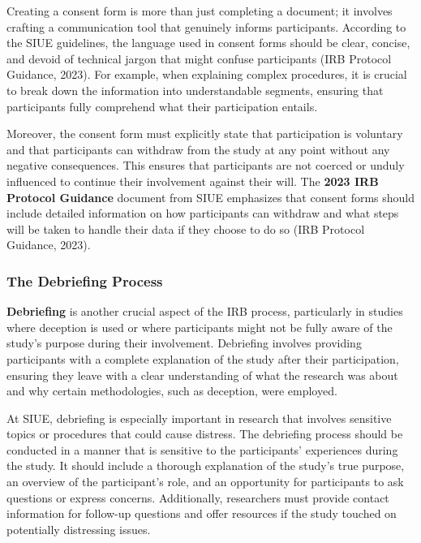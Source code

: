 \documentclass[
]{book}
\begin{document}
Creating a consent form is more than just completing a document; it involves crafting a communication tool that genuinely informs participants. According to the SIUE guidelines, the language used in consent forms should be clear, concise, and devoid of technical jargon that might confuse participants (IRB Protocol Guidance, 2023). For example, when explaining complex procedures, it is crucial to break down the information into understandable segments, ensuring that participants fully comprehend what their participation entails.

Moreover, the consent form must explicitly state that participation is voluntary and that participants can withdraw from the study at any point without any negative consequences. This ensures that participants are not coerced or unduly influenced to continue their involvement against their will. The \textbf{2023 IRB Protocol Guidance} document from SIUE emphasizes that consent forms should include detailed information on how participants can withdraw and what steps will be taken to handle their data if they choose to do so (IRB Protocol Guidance, 2023).

\subsubsection*{The Debriefing Process}\label{the-debriefing-process}

\textbf{Debriefing} is another crucial aspect of the IRB process, particularly in studies where deception is used or where participants might not be fully aware of the study's purpose during their involvement. Debriefing involves providing participants with a complete explanation of the study after their participation, ensuring they leave with a clear understanding of what the research was about and why certain methodologies, such as deception, were employed.

At SIUE, debriefing is especially important in research that involves sensitive topics or procedures that could cause distress. The debriefing process should be conducted in a manner that is sensitive to the participants' experiences during the study. It should include a thorough explanation of the study's true purpose, an overview of the participant's role, and an opportunity for participants to ask questions or express concerns. Additionally, researchers must provide contact information for follow-up questions and offer resources if the study touched on potentially distressing issues.
\end{document}
